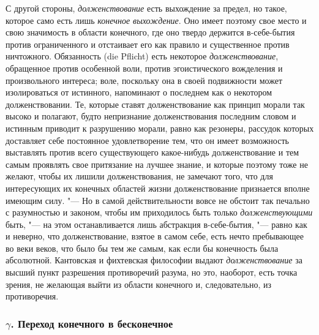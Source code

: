 С другой стороны, {\em долженствование} есть выхождение
за предел, но такое, которое само есть лишь
{\em конечное выхождение}. Оно имеет поэтому свое место
и свою значимость в области конечного, где оно твердо держится в-себе-бытия
против ограниченного и отстаивает его как правило и существенное против
ничтожного. Обязанность (die Pflicht) есть некоторое
{\em долженствование}, обращенное против особенной
воли, против эгоистического вожделения и произвольного интереса; воле,
поскольку она в своей подвижности может изолироваться от истинного,
напоминают о последнем как о некотором долженствовании. Те, которые ставят
долженствование как принцип морали так высоко и полагают, будто непризнание
долженствования последним словом и истинным приводит к разрушению морали,
равно как резонеры, рассудок которых доставляет себе постоянное
удовлетворение тем, что он имеет возможность выставлять против всего
существующего какое-нибудь долженствование и тем самым проявлять свое
притязание на лучшее знание, и которые поэтому тоже не желают, чтобы их лишили
долженствования, не замечают того, что для интересующих их конечных
областей жизни долженствование признается вполне имеющим силу. "--- Но в самой
действительности вовсе не обстоит так печально с разумностью и законом,
чтобы им приходилось быть только {\em долженствующими}
быть, "--- на этом останавливается лишь абстракция в-себе-бытия, "--- равно как и
неверно, что долженствование, взятое в самом себе, есть нечто пребывающее
во веки веков, что было бы тем же самым, как если бы конечность была
абсолютной. Кантовская и фихтевская философии выдают
{\em долженствование} за высший пункт разрешения
противоречий разума, но это, наоборот, есть точка зрения, не желающая выйти
из области конечного и, следовательно, из противоречия.

\subsubsection[$\gamma $. Переход конечного в бесконечное]{$\gamma $. Переход конечного в бесконечное}

